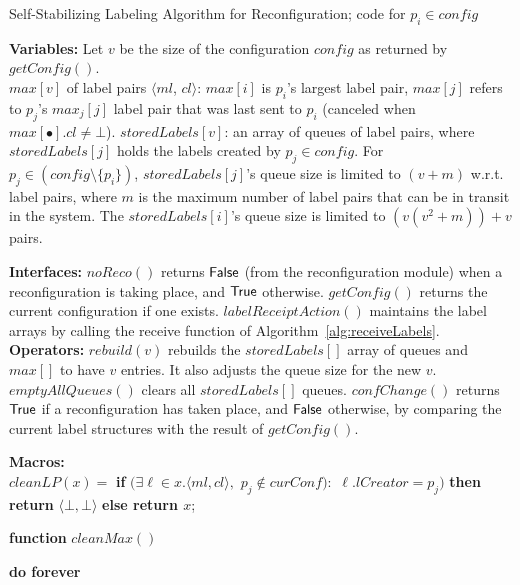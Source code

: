 \documentclass[11pt]{article}
\newcommand{\noReconfig}{noReco}
\begin{document}
\begin{algorithm*}[t!]
\caption{{Self-Stabilizing Labeling Algorithm for Reconfiguration; code for $p_i \in config$}}
\label{alg:configLabeling}


\begin{footnotesize}

{\bf Variables:} Let $v$ be the size of the configuration $config$ as returned by $getConfig()$.\\
$max[v]$ of label pairs $\langle ml$, $cl \rangle$: $max[i]$ is $p_i$'s largest label pair, $max[j]$ refers to $p_j$'s $max_j[j]$ label pair that was last sent to $p_i$ (canceled when $max[\bullet].cl \neq \bot$).
$storedLabels[v]$: an array of queues of label pairs, where $storedLabels[j]$ holds the labels created by $p_j \in config$. For $p_j \in (config \setminus \{ p_i \})$, $storedLabels[j]$'s queue size is limited to $(v+m)$ w.r.t. label pairs, where $m$ is the maximum number of label pairs that can be in transit in the system. The $storedLabels[i]$'s queue size is limited to $(v(v^2+m))+v$ pairs.

{\bf Interfaces:}
$\noReconfig()$ returns $\sf False$ (from the reconfiguration module) when a reconfiguration is taking place, and $\sf True$ otherwise.
$getConfig()$ returns the current configuration if one exists.
$labelReceiptAction()$ maintains the label arrays by calling the receive function of Algorithm~\ref{alg:receiveLabels}.\\
{\bf Operators:}
$rebuild(v)$ rebuilds the $storedLabels[]$ array of queues and $max[]$ to have $v$ entries. It also adjusts the queue size for the new $v$.
$emptyAllQueues()$ clears all $storedLabels[]$ queues.
$confChange()$ returns $\sf True$ if a reconfiguration has taken place, and $\sf False$ otherwise, by comparing the current label structures with the result of $getConfig()$.

{\bf Macros:}\\ $cleanLP(x) =$ {\bf if} $(\exists \ell \in x.\langle ml,cl \rangle,$ $p_j \not \in curConf):$ $\ell.lCreator = p_j)$ {\bf then return} $\langle \bot, \bot \rangle$ {\bf else return $x$}; 
\label{LAB:cleanLP}



{\bf function} $cleanMax()$  \label{LAB:cleanMax}




{\bf do forever} \label{LAB:doForever}\Begin{

}
\end{footnotesize}
\end{algorithm*}
\end{document}
